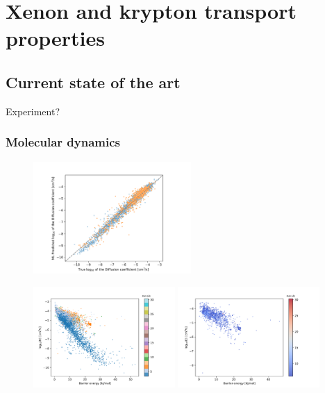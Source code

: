 \documentclass[main]{subfiles}
\begin{document}
\chapter{Xenon and krypton transport properties}
\vspace*{-1\baselineskip}

\section{Current state of the art}

Experiment? 

\subsection{Molecular dynamics}

\begin{figure}[ht]
  \centering
    \includegraphics[width=6cm]{figures/5-diffusion/diffusion_prediction.pdf}
    \caption{}
    \label{fgr:}
\end{figure}

\begin{figure}[ht]
  \centering
    \includegraphics[width=0.48\textwidth]{figures/5-diffusion/difflog_barrier_Df_uff.pdf}
    \includegraphics[width=0.48\textwidth]{figures/5-diffusion/difflog_barrier_Df_uff_2.pdf}
    \caption{}
    \label{fgr:}
\end{figure}
\end{document}
